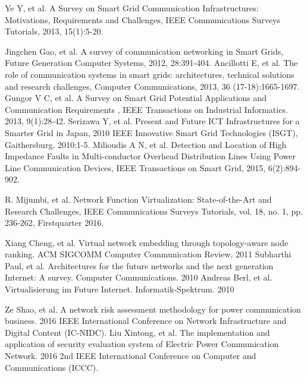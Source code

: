 \documentclass[AMA,STIX1COL]{WileyNJD-v2}
\begin{document}
\begin{thebibliography}{1}

 Ye Y, et al. A Survey on Smart Grid Communication Infrastructures: Motivations, Requirements and Challenges, IEEE Communications Surveys Tutorials, 2013, 15(1):5-20.

Jingchen Gao, et al. A survey of communication networking in Smart Grids, Future Generation Computer Systems, 2012, 28:391-404.
Ancillotti E, et al. The role of communication systems in smart grids: architectures, technical solutions and research challenges, Computer Communications, 2013, 36 (17-18):1665-1697. 
Gungor V C, et al. A Survey on Smart Grid Potential Applications and Communication Requirements , IEEE Transactions on Industrial Informatics. 2013, 9(1):28-42.
Serizawa Y, et al. Present and Future ICT Infrastructures for a Smarter Grid in Japan, 2010 IEEE Innovative Smart Grid Technologies (ISGT), Gaithersburg, 2010:1-5.
Milioudis A N, et al. Detection and Location of High Impedance Faults in Multi-conductor Overhead Distribution Lines Using Power Line Communication Devices, IEEE Transactions on Smart Grid, 2015, 6(2):894-902.

R. Mijumbi, et al. Network Function Virtualization: State-of-the-Art and Research Challenges, IEEE Communications Surveys Tutorials, vol. 18, no. 1, pp. 236-262, Firstquarter 2016.

Xiang Cheng, et al. Virtual network embedding through topology-aware node ranking. ACM SIGCOMM Computer Communication Review. 2011
Subharthi Paul, et al. Architectures for the future networks and the next generation Internet: A survey. Computer Communications. 2010 
 Andreas Berl, et al. Virtualisierung im Future Internet. Informatik-Spektrum. 2010

Ze Shao, et al. A network risk assessment methodology for power communication business. 2016 IEEE International Conference on Network Infrastructure and Digital Content (IC-NIDC).
Liu Xintong, et al. The implementation and application of security evaluation system of Electric Power Communication Network.  2016 2nd IEEE International Conference on Computer and Communications (ICCC).




\end{thebibliography}
\end{document}

